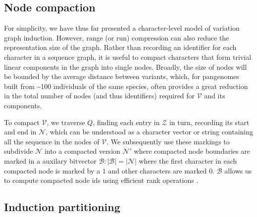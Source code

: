 \documentclass{bioinfo}
\theoremstyle{definition}
\newcommand{\red}[1]{{\textcolor{Red}{#1}}}
\newcommand{\FIXME}[1]{\red{[FIXME: #1]}}
\begin{document}





\subsection{Node compaction}

For simplicity, we have thus far presented a character-level model of variation graph induction.
However, range (or run) compression can also reduce the representation size of the graph.
Rather than recording an identifier for each character in a sequence graph, it is useful to compact characters that form trivial linear components in the graph into single nodes.
Broadly, the size of nodes will be bounded by the average distance between variants, which, for pangenomes built from \textasciitilde100 individuals of the same species, often provides a great reduction in the total number of nodes (and thus identifiers) required for $\mathcal{V}$ and its components.

To compact $\mathcal{V}$, we traverse $Q$, finding each entry in $\mathcal{Z}$ in turn, recording its start and end in $\mathcal{N}$, which can be understood as a character vector or string containing all the sequence in the nodes of $\mathcal{V}$.
We subsequently use these markings to subdivide $\mathcal{N}$ into a compacted version $\mathcal{N}'$ where compacted node boundaries are marked in a auxilary bitvector $\mathcal{B} : |\mathcal{B}| = |\mathcal{N}|$ where the first character in each compacted node is marked by a $1$ and other characters are marked $0$.
$\mathcal{B}$ allows us to compute compacted node ids using efficient rank operations \citep{Gog_2014}.


\subsection{Induction partitioning}
\label{sec:partitioning}
\end{document}
